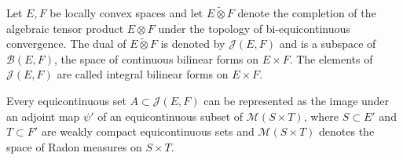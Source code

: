 Let $E, F$ be locally convex spaces and let $E \tilde{\otimes} F$ denote the completion of the algebraic tensor product $E \otimes F$ under the topology of bi-equicontinuous convergence. The dual of $E \tilde{\otimes} F$ is denoted by $\mathcal{J}(E, F)$ and is a subspace of $\mathcal{B}(E, F)$, the space of continuous bilinear forms on $E \times F$. The elements of $\mathcal{J}(E, F)$ are called integral bilinear forms on $E \times F$.

Every equicontinuous set $A \subset \mathcal{J}(E, F)$ can be represented as the image under an adjoint map $\psi'$ of an equicontinuous subset of $\mathcal{M}(S \times T)$, where $S \subset E'$ and $T \subset F'$ are weakly compact equicontinuous sets and $\mathcal{M}(S \times T)$ denotes the space of Radon measures on $S \times T$.
